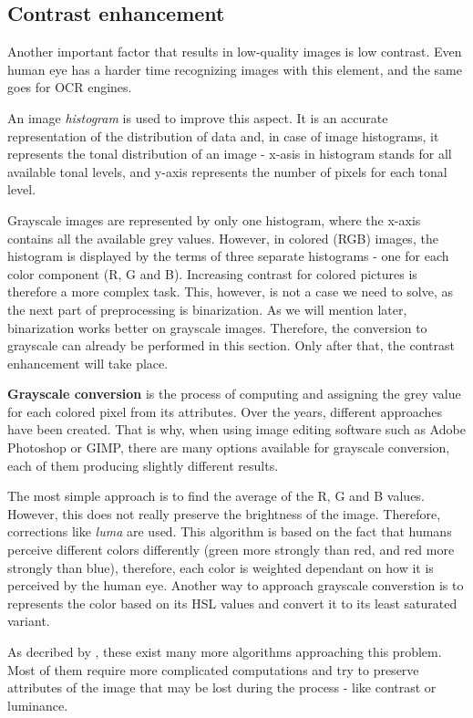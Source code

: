 \subsection{Contrast enhancement}

Another important factor that results in low-quality images is low contrast. Even human eye has a harder time recognizing images 
with this element, and the same goes for OCR engines. 

An image \emph{histogram} is used to improve this aspect. It is an accurate representation of the distribution of data and, in case of image histograms, it represents the tonal distribution of an image - x-asis in histogram stands for all available tonal levels, and y-axis represents the number of pixels for each tonal level.

Grayscale images are represented by only one histogram, where the x-axis contains all the available grey values. However, in colored (RGB) images, the histogram is displayed by the terms of three separate histograms - one for each color component (R, G and B). Increasing contrast for colored pictures is therefore a more complex task. This, however, is not a case we need to solve, as the next part of preprocessing is binarization. As we will mention later, binarization works better on grayscale images. Therefore, the conversion to grayscale can already be performed in this section. Only after that, the contrast enhancement will take place.

\textbf{Grayscale conversion} is the process of computing and assigning the grey value for each colored pixel from its attributes. Over the years, different approaches have been created. That is why, when using image editing software such as Adobe Photoshop or GIMP, there are many options available for grayscale conversion, each of them producing slightly different results. 

The most simple approach is to find the average of the R, G and B values. However, this does not really preserve the brightness of the image. Therefore, corrections like \emph{luma} \citep{grayscaleConv} are used. This algorithm is based on the fact that humans perceive different colors differently (green more strongly than red, and red more strongly than blue), therefore, each color is weighted dependant on how it is perceived by the human eye. Another way to approach grayscale converstion is to represents the color based on its HSL values and convert it to its least saturated variant.

As decribed by \citep{grayscaleCadik}, these exist many more algorithms approaching this problem. Most of them require more complicated computations and try to preserve attributes of the image that may be lost during the process - like contrast or luminance.

